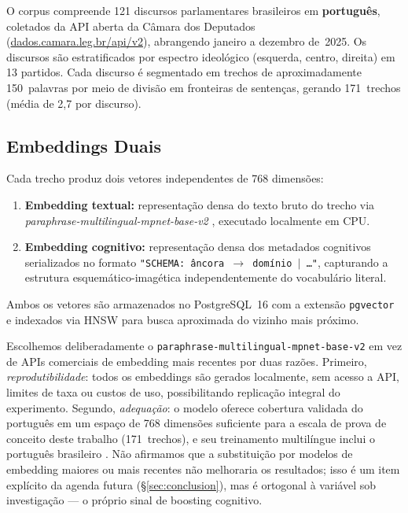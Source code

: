 \documentclass[11pt,a4paper]{article}
\begin{document}
O corpus compreende 121 discursos parlamentares brasileiros em
\textbf{português}, coletados da API aberta da Câmara dos Deputados
(\url{dados.camara.leg.br/api/v2}), abrangendo janeiro a dezembro
de~2025.
Os discursos são estratificados por espectro ideológico (esquerda,
centro, direita) em 13 partidos.
Cada discurso é segmentado em trechos de aproximadamente 150~palavras
por meio de divisão em fronteiras de sentenças, gerando 171~trechos
(média de 2,7 por discurso).

\subsection{Embeddings Duais}

Cada trecho produz dois vetores independentes de 768 dimensões:

\begin{enumerate}[noitemsep,topsep=2pt]
  \item \textbf{Embedding textual:} representação densa do texto bruto
        do trecho via \textit{paraphrase-multilingual-mpnet-base-v2}
        \citep{reimers2019sbert}, executado localmente em CPU.
  \item \textbf{Embedding cognitivo:} representação densa dos metadados
        cognitivos serializados no formato
        \texttt{"SCHEMA: âncora $\to$ domínio $|$ \ldots"}, capturando
        a estrutura esquemático-imagética independentemente do vocabulário
        literal.
\end{enumerate}

Ambos os vetores são armazenados no PostgreSQL~16 com a extensão
\texttt{pgvector} e indexados via HNSW para busca aproximada do
vizinho mais próximo.

Escolhemos deliberadamente o \texttt{paraphrase-multilingual-mpnet-base-v2}
em vez de APIs comerciais de embedding mais recentes por duas razões.
Primeiro, \emph{reprodutibilidade}: todos os embeddings são gerados
localmente, sem acesso a API, limites de taxa ou custos de uso,
possibilitando replicação integral do experimento.
Segundo, \emph{adequação}: o modelo oferece cobertura validada do
português em um espaço de 768 dimensões suficiente para a escala de
prova de conceito deste trabalho (171~trechos), e seu treinamento
multilíngue inclui o português brasileiro \citep{souza2020bertimbau}.
Não afirmamos que a substituição por modelos de embedding maiores ou
mais recentes não melhoraria os resultados; isso é um item explícito da
agenda futura (\S\ref{sec:conclusion}), mas é ortogonal à variável sob
investigação — o próprio sinal de boosting cognitivo.
\end{document}
